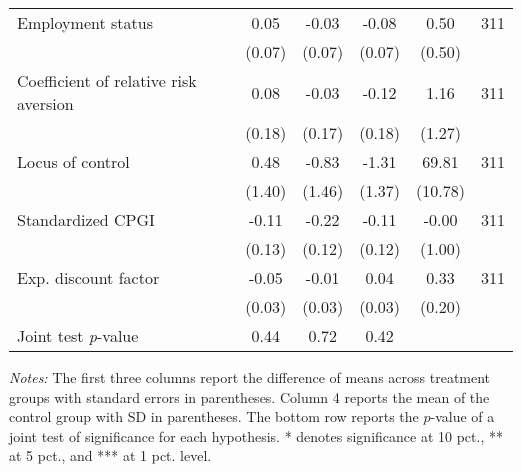 \begin{table}[h]
{\begin{threeparttable}
\begin{tabular}{l*{5}{c}}
Employment status&     0.05&    -0.03&    -0.08&     0.50&      311\\
          &   (0.07)&   (0.07)&   (0.07)&   (0.50)&         \\
Coefficient of relative risk aversion&     0.08&    -0.03&    -0.12&     1.16&      311\\
          &   (0.18)&   (0.17)&   (0.18)&   (1.27)&         \\
Locus of control&     0.48&    -0.83&    -1.31&    69.81&      311\\
          &   (1.40)&   (1.46)&   (1.37)&  (10.78)&         \\
Standardized CPGI&    -0.11&-0.22\sym{*}&    -0.11&    -0.00&      311\\
          &   (0.13)&   (0.12)&   (0.12)&   (1.00)&         \\
Exp. discount factor&-0.05\sym{*}&    -0.01&     0.04&     0.33&      311\\
          &   (0.03)&   (0.03)&   (0.03)&   (0.20)&         \\
\midrule Joint test \emph{p}-value&     0.44&     0.72&     0.42&         &         \\
\bottomrule \end{tabular} \begin{tablenotes}[flushleft] \footnotesize \item \emph{Notes:} The first three columns report the difference of means across treatment groups with standard errors in parentheses. Column 4 reports the mean of the control group with SD in parentheses. The bottom row reports the \(p\)-value of a joint test of significance for each hypothesis. * denotes significance at 10 pct., ** at 5 pct., and *** at 1 pct. level. \end{tablenotes} \end{threeparttable} } \end{table}

